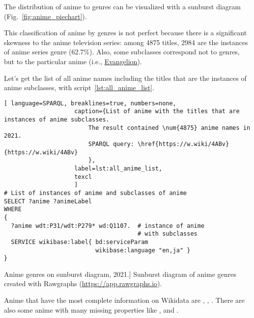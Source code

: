 The distribution of anime to genres can be visualized with a sunburst diagram (Fig.~\ref{fig:anime_piechart}).

This classification of anime by genres is not perfect because there is a significant skewness to the anime television series: among \num{4875} titles, \num{2984} are the instances of anime series genre (\num{62,7}\%). Also, some subclasses correspond not to genres, but to the particular anime (i.e., \href{https://w.wiki/3iKe}{Evangelion}).

Let's get the list of all anime names including the titles that are the instances of anime subclasses, with script~\ref{lst:all_anime_list}.

\begin{lstlisting}[ language=SPARQL, breaklines=true, numbers=none,
                    caption={List of anime with the titles that are instances of anime subclasses.
                        The result contained \num{4875} anime names in 2021.
                        SPARQL query: \href{https://w.wiki/4ABv}{https://w.wiki/4ABv}
                        },
                    label=lst:all_anime_list,
                    texcl 
                    ]
# List of instances of anime and subclasses of anime
SELECT ?anime ?animeLabel
WHERE
{
  ?anime wdt:P31/wdt:P279* wd:Q1107.  # instance of anime
                                      # with subclasses
  SERVICE wikibase:label{ bd:serviceParam 
                          wikibase:language "en,ja" }
}
\end{lstlisting}%

\begin{marginfigure}[0.0cm]
{
	\setlength{\fboxsep}{0pt}%
	\setlength{\fboxrule}{1pt}%
}
\caption
[Anime genres on sunburst diagram, 2021.]
{
Sunburst diagram of anime genres created with Rawgraphs (\href{https://app.rawgraphs.io}{https://app.rawgraphs.io}).\newline
}
\label{fig:anime_piechart}
\end{marginfigure}

Anime that have the most complete information on Wikidata are , , . There are also some anime with many missing properties like ,  and .

